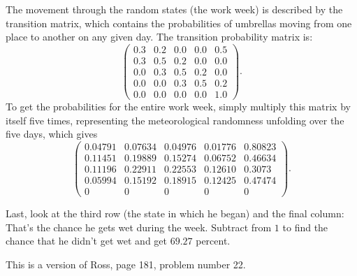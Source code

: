 \documentclass[12pt]{article}
\begin{document}
\begin{solution}
    The movement through the random states (the work week) is described
    by the transition matrix, which contains the probabilities of
    umbrellas moving from one place to another on any given day. The
    transition probability matrix is:
    \[
        \begin{pmatrix}
            0.3 & 0.2 & 0.0 & 0.0 & 0.5\\
            0.3 & 0.5 & 0.2 & 0.0 & 0.0\\
            0.0 & 0.3 & 0.5 & 0.2 & 0.0\\
            0.0 & 0.0 & 0.3 & 0.5 & 0.2\\
            0.0 & 0.0 & 0.0 & 0.0 & 1.0
        \end{pmatrix}
        .
    \] To get the probabilities for the entire work week, simply
    multiply this matrix by itself five times, representing the
    meteorological randomness unfolding over the five days, which gives
    \[
        \begin{pmatrix}
            \nonumber 0.04791 &0.07634 &0.04976 &0.01776 &0.80823\\
            0.11451 &0.19889 &0.15274 &0.06752 &0.46634\\
            0.11196 &0.22911 &0.22553 &0.12610 &0.3073\\
            0.05994 &0.15192 &0.18915 &0.12425 &0.47474\\
            0 &0 &0 &0 &0
        \end{pmatrix}
        .
    \]

    Last, look at the third row (the state in which he began) and the
    final column:  That's the chance he gets wet during the week.
    Subtract from \( 1 \) to find the chance that he didn't get wet and
    get \( 69.27 \) percent.

    \begin{remark}
        This is a version of Ross, page 181, problem number 22.
    \end{remark}
  \end{solution}
  
\end{document}
